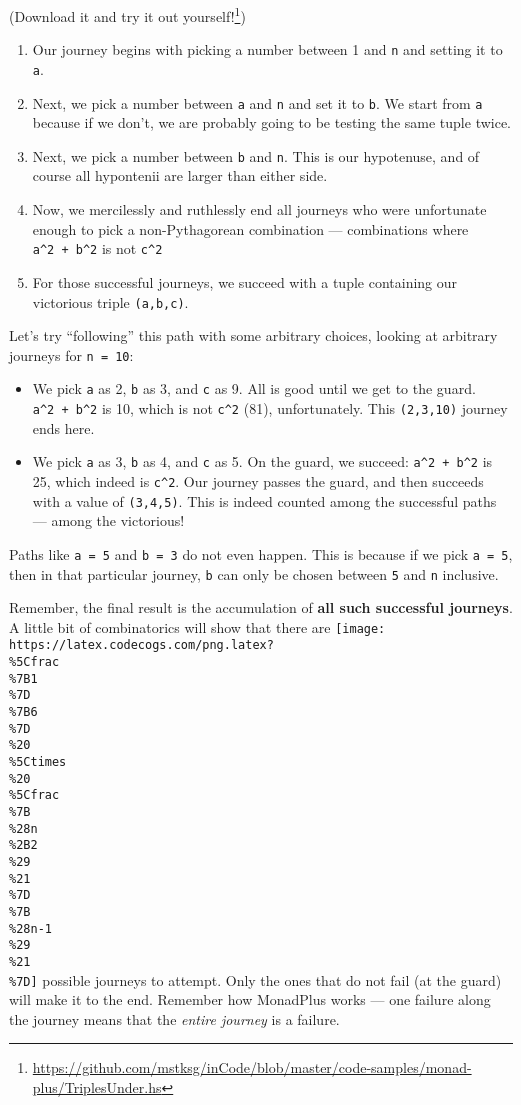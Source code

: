 \documentclass[]{article}
\renewcommand{\href}[2]{#2\footnote{\url{#1}}}
\begin{document}
(\href{https://github.com/mstksg/inCode/blob/master/code-samples/monad-plus/TriplesUnder.hs}{Download
it and try it out yourself!})

\begin{enumerate}
\def\labelenumi{\arabic{enumi}.}
\tightlist
\item
  Our journey begins with picking a number between 1 and \texttt{n} and setting
  it to \texttt{a}.
\item
  Next, we pick a number between \texttt{a} and \texttt{n} and set it to
  \texttt{b}. We start from \texttt{a} because if we don't, we are probably
  going to be testing the same tuple twice.
\item
  Next, we pick a number between \texttt{b} and \texttt{n}. This is our
  hypotenuse, and of course all hypontenii are larger than either side.
\item
  Now, we mercilessly and ruthlessly end all journeys who were unfortunate
  enough to pick a non-Pythagorean combination --- combinations where
  \texttt{a\^{}2\ +\ b\^{}2} is not \texttt{c\^{}2}
\item
  For those successful journeys, we succeed with a tuple containing our
  victorious triple \texttt{(a,b,c)}.
\end{enumerate}

Let's try ``following'' this path with some arbitrary choices, looking at
arbitrary journeys for \texttt{n\ =\ 10}:

\begin{itemize}
\tightlist
\item
  We pick \texttt{a} as 2, \texttt{b} as 3, and \texttt{c} as 9. All is good
  until we get to the guard. \texttt{a\^{}2\ +\ b\^{}2} is 10, which is not
  \texttt{c\^{}2} (81), unfortunately. This \texttt{(2,3,10)} journey ends here.
\item
  We pick \texttt{a} as 3, \texttt{b} as 4, and \texttt{c} as 5. On the guard,
  we succeed: \texttt{a\^{}2\ +\ b\^{}2} is 25, which indeed is \texttt{c\^{}2}.
  Our journey passes the guard, and then succeeds with a value of
  \texttt{(3,4,5)}. This is indeed counted among the successful paths --- among
  the victorious!
\end{itemize}

Paths like \texttt{a\ =\ 5} and \texttt{b\ =\ 3} do not even happen. This is
because if we pick \texttt{a\ =\ 5}, then in that particular journey, \texttt{b}
can only be chosen between \texttt{5} and \texttt{n} inclusive.

Remember, the final result is the accumulation of \textbf{all such successful
journeys}. A little bit of combinatorics will show that there are
\texttt{[image: https://latex.codecogs.com/png.latex?\\\%5Cfrac\\\%7B1\\\%7D\\\%7B6\\\%7D\\\%20\\\%5Ctimes\\\%20\\\%5Cfrac\\\%7B\\\%28n\\\%2B2\\\%29\\\%21\\\%7D\\\%7B\\\%28n-1\\\%29\\\%21\\\%7D]}
possible journeys to attempt. Only the ones that do not fail (at the guard) will
make it to the end. Remember how MonadPlus works --- one failure along the
journey means that the \emph{entire journey} is a failure.
\end{document}
